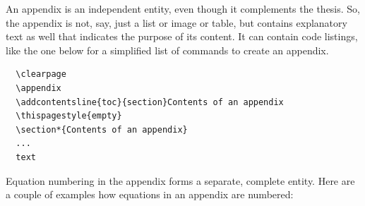 \documentclass[english, 12pt, a4paper, sci, utf8, a-2b, online]{aaltothesis}
\begin{document}
An appendix is an independent entity, even though it complements the thesis.
So, the appendix is not, say, just a list or image or table, but contains
explanatory text as well that indicates the purpose of its content. It can
contain code listings, like the one below for a simplified list of commands to
create an appendix.
\begin{verbatim}
  \clearpage
  \appendix
  \addcontentsline{toc}{section}Contents of an appendix
  \thispagestyle{empty}
  \section*{Contents of an appendix}
  ...
  text
\end{verbatim}

Equation numbering in the appendix forms a separate, complete entity. Here are a couple of examples how equations in an appendix are numbered:






\clearpage
\end{document}
